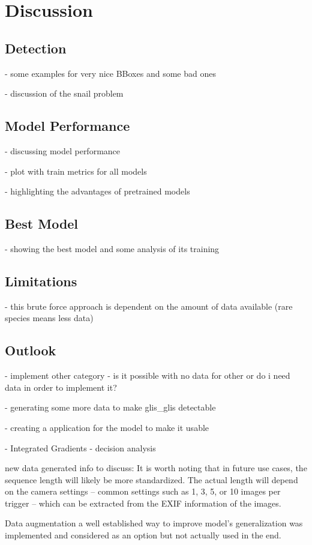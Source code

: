


\section{Discussion}
\label{discussion}

    \subsection{Detection}
    - some examples for very nice BBoxes and some bad ones

    - discussion of the snail problem

    \subsection{Model Performance}
    - discussing model performance

    - plot with train metrics for all models

    - highlighting the advantages of pretrained models

    \subsection{Best Model}
    - showing the best model and some analysis of its training

    \subsection{Limitations}
    - this brute force approach is dependent on the amount of data available (rare species means less data)

    \subsection{Outlook}
    - implement other category - is it possible with no data for other or do i need data in order to implement it?

    - generating some more data to make glis\_glis detectable

    - creating a application for the model to make it usable

    - Integrated Gradients - decision analysis


    new data generated info to discuss:
    It is worth noting that in future use cases, the sequence length will likely be more standardized.
    The actual length will depend on the camera settings -- common settings such as 1, 3, 5, or 10 images per trigger -- which can be extracted from the EXIF information of the images.

    Data augmentation a well established way to improve model's generalization \autocite{shortenSurveyImageData2019} was implemented and considered as an option but not actually used in the end.